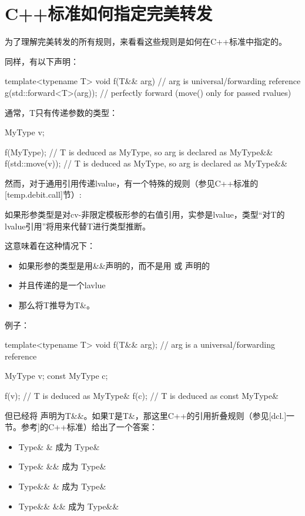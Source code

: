 \section{C++标准如何指定完美转发}
为了理解完美转发的所有规则，来看看这些规则是如何在C++标准中指定的。

同样，有以下声明：

\begin{cppcode}
template<typename T>
void f(T&& arg) // arg is universal/forwarding reference
{
	g(std::forward<T>(arg)); // perfectly forward (move() only for passed rvalues)
}
\end{cppcode}

通常，T只有传递参数的类型：

\begin{cppcode}
MyType v;

f(MyType{}); // T is deduced as MyType, so arg is declared as MyType&&
f(std::move(v)); // T is deduced as MyType, so arg is declared as MyType&&
\end{cppcode}

然而，对于通用引用传递lvalue，有一个特殊的规则（参见C++标准的[temp.debit.call]节）:

如果形参类型是对cv-非限定模板形参的右值引用，实参是lvalue，类型“对T的lvalue引用”将用来代替T进行类型推断。



这意味着在这种情况下：

\begin{itemize}
	\item 如果形参的类型是用\&\&声明的，而不是用  或  声明的
	\item 并且传递的是一个lavlue
	\item 那么将T推导为T\&。
\end{itemize}

例子：

\begin{cppcode}
template<typename T>
void f(T&& arg); // arg is a universal/forwarding reference

MyType v;
const MyType c;

f(v); // T is deduced as MyType&
f(c); // T is deduced as const MyType&
\end{cppcode}

但已经将  声明为T\&\&。如果T是T\&，那这里C++的引用折叠规则（参见[dcl.]一节。参考]的C++标准）给出了一个答案：

\begin{itemize}
	\item Type\& \& 成为 Type\&
	\item Type\& \&\& 成为 Type\&
	\item Type\&\& \& 成为 Type\&
	\item Type\&\& \&\& 成为 Type\&\&
\end{itemize}

